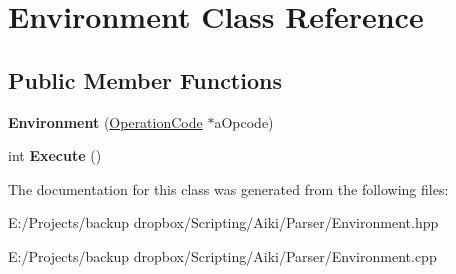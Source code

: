 \hypertarget{a00006}{\section{Environment Class Reference}
\label{a00006}
}
\subsection*{Public Member Functions}
\begin{DoxyCompactItemize}
\item 
\hypertarget{a00006_a48378b6044373edbcf5ed4dfd9f53b53}{{\bfseries Environment} (\hyperlink{a00015}{Operation\+Code} $\ast$a\+Opcode)}\label{a00006_a48378b6044373edbcf5ed4dfd9f53b53}

\item 
\hypertarget{a00006_a6b4bdfcd11e23fdd24efab9d33b8734d}{int {\bfseries Execute} ()}\label{a00006_a6b4bdfcd11e23fdd24efab9d33b8734d}

\end{DoxyCompactItemize}


The documentation for this class was generated from the following files\+:\begin{DoxyCompactItemize}
\item 
E\+:/\+Projects/backup dropbox/\+Scripting/\+Aiki/\+Parser/Environment.\+hpp\item 
E\+:/\+Projects/backup dropbox/\+Scripting/\+Aiki/\+Parser/Environment.\+cpp\end{DoxyCompactItemize}
